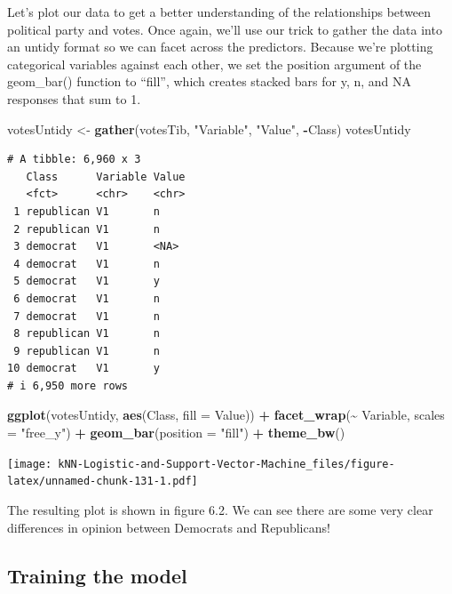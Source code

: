 \documentclass[
]{article}
\newenvironment{Shaded}{\begin{snugshade}}{\end{snugshade}}
\newcommand{\AttributeTok}[1]{\textcolor[rgb]{0.13,0.29,0.53}{#1}}
\newcommand{\FunctionTok}[1]{\textcolor[rgb]{0.13,0.29,0.53}{\textbf{#1}}}
\newcommand{\NormalTok}[1]{#1}
\newcommand{\OtherTok}[1]{\textcolor[rgb]{0.56,0.35,0.01}{#1}}
\newcommand{\SpecialCharTok}[1]{\textcolor[rgb]{0.81,0.36,0.00}{\textbf{#1}}}
\newcommand{\StringTok}[1]{\textcolor[rgb]{0.31,0.60,0.02}{#1}}
\begin{document}
Let's plot our data to get a better understanding of the relationships
between political party and votes. Once again, we'll use our trick to
gather the data into an untidy format so we can facet across the
predictors. Because we're plotting categorical variables against each
other, we set the position argument of the geom\_bar() function to
``fill'', which creates stacked bars for y, n, and NA responses that sum
to 1.

\begin{Shaded}
\begin{Highlighting}[]
\NormalTok{votesUntidy }\OtherTok{\textless{}{-}} \FunctionTok{gather}\NormalTok{(votesTib, }\StringTok{"Variable"}\NormalTok{, }\StringTok{"Value"}\NormalTok{, }\SpecialCharTok{{-}}\NormalTok{Class)}
\NormalTok{votesUntidy}
\end{Highlighting}
\end{Shaded}

\begin{verbatim}
# A tibble: 6,960 x 3
   Class      Variable Value
   <fct>      <chr>    <chr>
 1 republican V1       n    
 2 republican V1       n    
 3 democrat   V1       <NA> 
 4 democrat   V1       n    
 5 democrat   V1       y    
 6 democrat   V1       n    
 7 democrat   V1       n    
 8 republican V1       n    
 9 republican V1       n    
10 democrat   V1       y    
# i 6,950 more rows
\end{verbatim}

\begin{Shaded}
\begin{Highlighting}[]
\FunctionTok{ggplot}\NormalTok{(votesUntidy, }\FunctionTok{aes}\NormalTok{(Class, }\AttributeTok{fill =}\NormalTok{ Value)) }\SpecialCharTok{+}
  \FunctionTok{facet\_wrap}\NormalTok{(}\SpecialCharTok{\textasciitilde{}}\NormalTok{ Variable, }\AttributeTok{scales =} \StringTok{"free\_y"}\NormalTok{) }\SpecialCharTok{+}
  \FunctionTok{geom\_bar}\NormalTok{(}\AttributeTok{position =} \StringTok{"fill"}\NormalTok{) }\SpecialCharTok{+}
  \FunctionTok{theme\_bw}\NormalTok{()}
\end{Highlighting}
\end{Shaded}

\texttt{[image: kNN-Logistic-and-Support-Vector-Machine\_files/figure-latex/unnamed-chunk-131-1.pdf]}

The resulting plot is shown in figure 6.2. We can see there are some
very clear differences in opinion between Democrats and Republicans!

\subsection{Training the model}\label{training-the-model-1}
\end{document}
